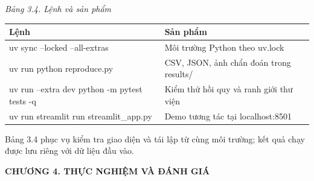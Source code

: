 \documentclass[12pt,a4paper]{extreport}
\begin{document}
\par
{\fontsize{10.5}{12}\selectfont\textit{Bảng 3.4. Lệnh và sản phẩm}
\begin{longtable}{>{\raggedright\arraybackslash}p{7.693cm}|>{\raggedright\arraybackslash}p{7.693cm}}
\textbf{Lệnh} & \textbf{Sản phẩm}\\\hline
\endhead
uv sync --locked --all-extras & Môi trường Python theo uv.lock\\\hline
uv run python reproduce.py & CSV,\allowbreak{} JSON,\allowbreak{} ảnh chẩn đoán trong results/\allowbreak{}\\\hline
uv run --extra dev python -m pytest tests -q & Kiểm thử hồi quy và ranh giới thư viện\\\hline
uv run streamlit run streamlit\_app.py & Demo tương tác tại localhost:8501\\\hline
\end{longtable}}
Bảng 3.4 phục vụ kiểm tra giao diện và tái lập từ cùng môi trường; kết quả chạy được lưu riêng với dữ liệu đầu vào.
\par
\clearpage
\begin{center}\Large\bfseries CHƯƠNG 4. THỰC NGHIỆM VÀ ĐÁNH GIÁ\end{center}
\end{document}
